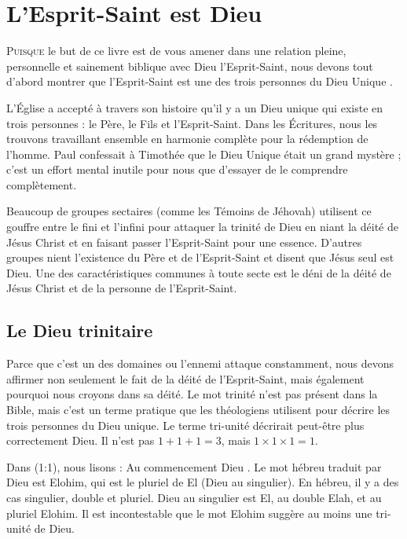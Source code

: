 \chapter{L'Esprit-Saint est Dieu}

\lettrine[lines=3]{P}{uisque} le but de ce livre est de vous amener dans une relation pleine, personnelle et sainement biblique avec Dieu l'Esprit-Saint, nous devons tout d'abord montrer que l'Esprit-Saint est une des trois personnes du Dieu Unique .

L'Église a accepté à travers son histoire qu'il y a un Dieu unique qui existe en trois personnes : le Père, le Fils et l'Esprit-Saint. Dans les Écritures, nous les trouvons travaillant ensemble en harmonie complète pour la rédemption de l'homme. Paul confessait à Timothée que le Dieu Unique était un grand mystère ; c'est un effort mental inutile pour nous que d'essayer de le comprendre complètement.

Beaucoup de groupes sectaires (comme les Témoins de Jéhovah) utilisent ce gouffre entre le fini et l'infini pour attaquer la trinité de Dieu en niant la déité de Jésus Christ et en faisant passer l'Esprit-Saint pour une essence. D'autres groupes nient l'existence du Père et de l'Esprit-Saint et disent que Jésus seul est Dieu. Une des caractéristiques communes à toute secte est le déni de la déité de Jésus Christ et de la personne de l'Esprit-Saint.

\section{Le Dieu trinitaire}

Parce que c'est un des domaines ou l'ennemi attaque constamment, nous devons affirmer non seulement le fait de la déité de l'Esprit-Saint, mais également pourquoi nous croyons dans sa déité. Le mot \og trinité \fg{} n'est pas présent dans la Bible, mais c'est un terme pratique que les théologiens utilisent pour décrire les trois personnes du Dieu unique. Le terme \og tri-unité \fg{} décrirait peut-être plus correctement Dieu. Il n'est pas $1 + 1 + 1 = 3$, mais $1 \times 1 \times 1 = 1$.

Dans (1:1), nous lisons : \og Au commencement Dieu \fg{}. Le mot hébreu traduit par \og Dieu \fg{} est Elohim, qui est le pluriel de El (Dieu au singulier). En hébreu, il y a des cas singulier, double et pluriel. \og Dieu \fg{} au singulier est El, au double Elah, et au pluriel Elohim. Il est incontestable que le mot \og Elohim \fg{} suggère au moins une tri-unité de Dieu.

